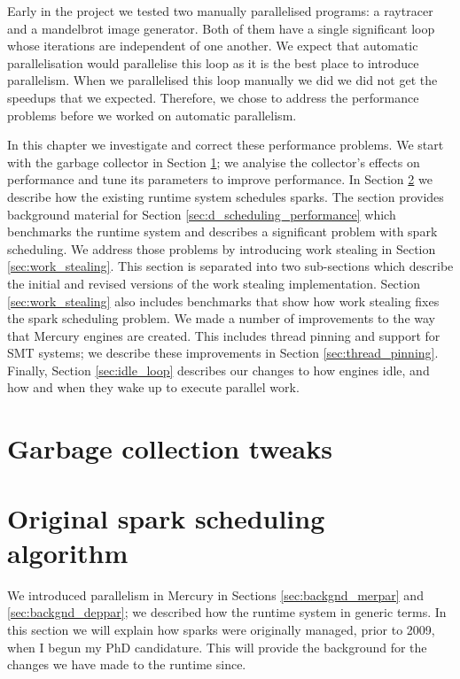 

Early in the project
we tested two manually parallelised programs:
a raytracer and a mandelbrot image generator.
Both of them have a single significant loop
whose iterations are independent of one another.
We expect that automatic parallelisation would parallelise this loop
as it is the best place to introduce parallelism.
When we parallelised this loop manually we did
we did not get the speedups that we expected.
Therefore,
we chose to address the performance problems
before we worked on automatic parallelism.

In this chapter we investigate and correct these performance problems.
We start with the garbage collector in Section \ref{sec:gc};
we analyise the collector's effects on performance and tune its parameters
to improve performance.
In Section \ref{sec:original_scheduling} we describe how the existing runtime
system schedules sparks.
The section provides background material for Section
\ref{sec:d_scheduling_performance}
which benchmarks the runtime system and describes a significant problem with
spark scheduling.
We address those problems by introducing work stealing in Section
\ref{sec:work_stealing}.
This section is separated into two sub-sections
which describe the initial and revised versions of the work stealing
implementation.
Section \ref{sec:work_stealing} also includes benchmarks that show
how work stealing fixes the spark scheduling problem.
We made a number of improvements to the way that Mercury engines are created.
This includes thread pinning and support for SMT systems;
we describe these improvements in Section \ref{sec:thread_pinning}.
Finally, Section \ref{sec:idle_loop} describes our changes to how engines
idle,
and how and when they wake up to execute parallel work.

\section{Garbage collection tweaks}
\label{sec:gc}




\section{Original spark scheduling algorithm}
\label{sec:original_scheduling}


We introduced parallelism in Mercury in Sections \ref{sec:backgnd_merpar} and
\ref{sec:backgnd_deppar};
we described how the runtime system in generic terms.
In this section we will explain how sparks were originally managed,
prior to 2009, when I begun my PhD candidature.
This will provide the background for the changes we have made to the
runtime since.


